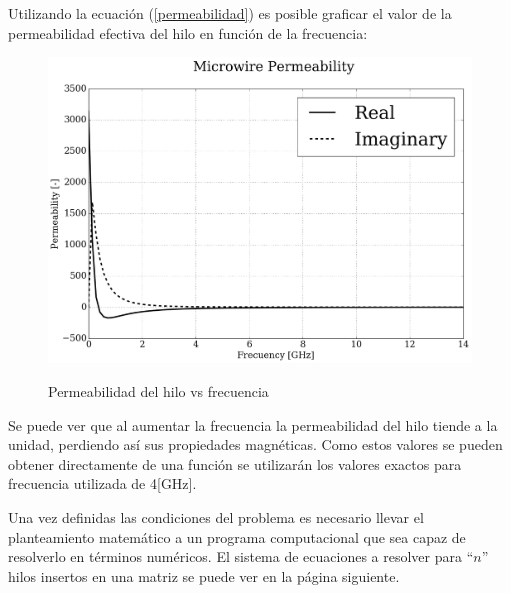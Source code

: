 \documentclass[12pt,letterpaper]{article}
\numberwithin{equation}{section}
\begin{document}
Utilizando la ecuación (\ref{permeabilidad}) es posible graficar el valor de la permeabilidad efectiva del hilo en función de la frecuencia:

\begin{figure}[H]
	\centering\includegraphics[scale=0.4]{Imagenes/wire_permeability.png}\\
	\caption{Permeabilidad del hilo vs frecuencia}
	\label{fig:wire_permeability}
\end{figure}

Se puede ver que al aumentar la frecuencia la permeabilidad del hilo tiende a la unidad, perdiendo así sus propiedades magnéticas. Como estos valores se pueden obtener directamente de una función se utilizarán los valores exactos para frecuencia utilizada de 4[GHz].

Una vez definidas las condiciones del problema es necesario llevar el planteamiento matemático a un programa computacional que sea capaz de resolverlo en términos numéricos. El sistema de ecuaciones a resolver para ``$n$'' hilos insertos en una matriz se puede ver en la página siguiente.
\end{document}
